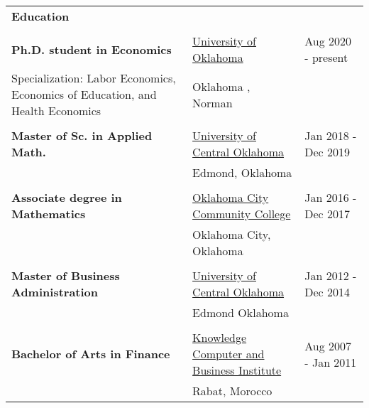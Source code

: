\documentclass[10pt,letterpaper]{article}
\begin{document}
\begin{tabular}{p{2.75in}p{3.05in}p{4.0in}}
\\
{\textbf{\large{Education}}} & &\\
\\
\textbf{Ph.D.  student in Economics} & \href{https://www.ou.edu/web/}{University of Oklahoma} & Aug 2020 - present\\
Specialization: Labor Economics, Economics of Education,  and  Health Economics & Oklahoma ,  Norman\\
\\
\textbf{Master of Sc. in Applied Math.} & \href{https://www.uco.edu/}{University of Central Oklahoma } & Jan 2018 - Dec 2019\\
&Edmond,  Oklahoma & \\
\\
\textbf{Associate degree in Mathematics} & \href{https://www.occc.edu/}{Oklahoma City Community College} & Jan 2016 - Dec 2017 \\
&Oklahoma City,  Oklahoma& \\
\\
\textbf{Master of Business Administration} & \href{https://www.uco.edu/}{University of Central Oklahoma} & Jan 2012 - Dec 2014 \\
&Edmond  Oklahoma& \\
\\
\textbf{Bachelor of Arts in Finance} & \href{https://www.knowledgecbi.net/en/Contact\%20US_EN.html}{Knowledge Computer and Business Institute} & Aug 2007 - Jan 2011  \\
&Rabat, Morocco& \\
\end{tabular}
\end{document}
